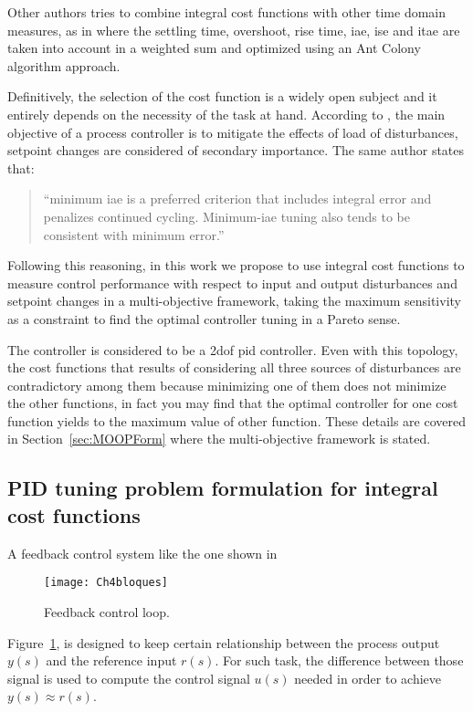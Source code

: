 Other authors tries to combine integral cost functions with other time domain measures, as in \citet{Chiha2012} where the settling time, overshoot, rise time, \gls{iae}, \gls{ise} and \gls{itae} are taken into account in a weighted sum and optimized using an Ant Colony algorithm approach.

Definitively, the selection of the cost function is a widely open subject and it entirely depends on the necessity of the task at hand. According to \citet{Shinskey2002}, the main objective of a process controller is to mitigate the effects of load of disturbances, setpoint changes are considered of secondary importance. The same author states that: \begin{quote}
	``minimum \gls{iae} is a preferred criterion that includes integral error and penalizes continued cycling. Minimum-\gls{iae} tuning also tends to be consistent with minimum error.''
\end{quote}
%

Following this reasoning, in this work we propose to use integral cost functions to measure control performance with respect to input and output disturbances and setpoint changes in a multi-objective framework, taking the maximum sensitivity as a constraint to find the optimal controller tuning in a Pareto sense.

The controller is considered to be a \gls{2dof} \gls{pid} controller. Even with this topology, the cost functions that results of considering all three sources of disturbances are contradictory among them because minimizing one of them does not minimize the other functions, in fact you may find that the optimal controller for one cost function yields to the maximum value of other function. These details are covered in Section~\ref{sec:MOOPForm} where the multi-objective framework is stated.

\subsection{PID tuning problem formulation for integral cost functions}
\label{sec:CostProbPID}
A feedback control system like the one shown in %
\begin{figure}[tb]
	\centering
	\texttt{[image: Ch4bloques]}%
	\caption{Feedback control loop.}%
	\label{fig:bloques}%
\end{figure}
%
Figure~\ref{fig:bloques}, is designed to keep certain relationship between the process output $y(s)$ and the reference input $r(s)$. For such task, the difference between those signal is used to compute the control signal $u(s)$ needed in order to achieve $y(s) \approx r(s)$. 

